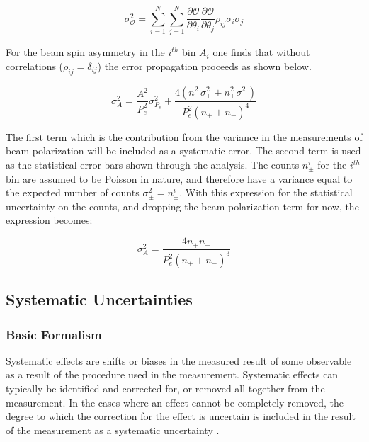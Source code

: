 \begin{equation}
  \label{eqn:error-propagation}
  \sigma_{\mathcal{O}}^2 = \sum_{i=1}^{N} \sum_{j=1}^{N} \frac{\partial \mathcal{O}}{\partial \theta_i} \frac{\partial \mathcal{O}}{\partial \theta_j} \rho_{ij} \sigma_i \sigma_j 
\end{equation}
  
For the beam spin asymmetry in the $i^{th}$ bin $A_i$ one finds that without correlations ($\rho_{ij} = \delta_{ij}$) the error propagation proceeds as shown below.

\begin{equation}
  \sigma_{A}^{2} = \frac{A^2}{P_{e}^2} \sigma_{P_{e}}^{2} + \frac{4 (n_{-}^{2} \sigma_{+}^{2}  + n_{+}^{2} \sigma_{-}^{2})}{ P_{e}^{2} (n_{+} + n_{-})^4}
\end{equation} 

The first term which is the contribution from the variance in the measurements of beam polarization will be included as a systematic error.  The second term is used as the statistical error bars shown through the analysis.  The counts $n_{\pm}^{i}$ for the $i^{th}$ bin are assumed to be Poisson in nature, and therefore have a variance equal to the expected number of counts $\sigma_{\pm}^{2} = n_{\pm}^{i}$.  With this expression for the statistical uncertainty on the counts, and dropping the beam polarization term for now, the expression becomes: 

\begin{equation}
  \sigma_{A}^{2} = \frac{4n_+ n_-}{P_{e}^{2} (n_+ + n_-)^3}
\end{equation}

\subsection*{Systematic Uncertainties}


\subsubsection*{Basic Formalism}

Systematic effects are shifts or biases in the measured result of some observable as a result of the procedure used in the measurement.  Systematic effects can typically be identified and corrected for, or removed all together from the measurement.  In the cases where an effect cannot be completely removed, the degree to which the correction for the effect is uncertain is included in the result of the measurement as a systematic uncertainty \cite{misc-barlow:2002}. \\

